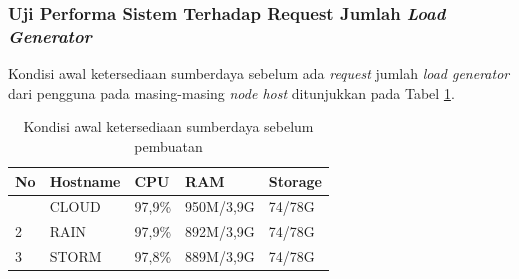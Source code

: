 			\subsubsection{Uji Performa Sistem Terhadap Request Jumlah \textit{Load Generator}}
				Kondisi awal ketersediaan sumberdaya sebelum ada \textit{request} jumlah \textit{load generator} dari pengguna pada masing-masing \textit{node host} ditunjukkan pada Tabel \ref{suberdayaawalperforma}.
				\begin{longtable}{|p{}|p{}|p{}|p{}|p{}|}
					\caption{Kondisi awal ketersediaan sumberdaya sebelum pembuatan} \label{suberdayaawalperforma} \\
					\hline
					\textbf{No} & \textbf{Hostname} & \textbf{CPU} & \textbf{RAM} & \textbf{Storage} \\ \hline
					\endhead
					\endfoot
					\endlastfoot
					1 & CLOUD & 97,9\% & 950M/3,9G & 74/78G \\ \hline
					2 & RAIN & 97,9\% & 892M/3,9G & 74/78G \\ \hline
					3 & STORM & 97,8\% & 889M/3,9G & 74/78G \\ \hline
				\end{longtable}
			
